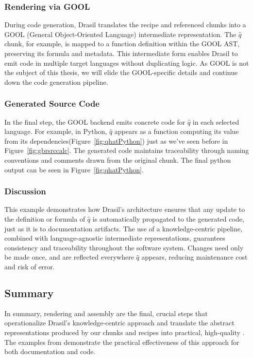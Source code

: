 \subsubsection{Rendering via GOOL}

During code generation, Drasil translates the recipe and referenced chunks into 
a GOOL (General Object-Oriented Language) intermediate representation. The 
$\hat{q}$ chunk, for example, is mapped to a function definition within the 
GOOL AST, preserving its formula and metadata. This intermediate form enables 
Drasil to emit code in multiple target languages without duplicating logic. As 
GOOL is not the subject of this thesis, we will elide the GOOL-specific details 
and continue down the code generation pipeline.

\subsubsection{Generated Source Code}

In the final step, the GOOL backend emits concrete code for $\hat{q}$ in each 
selected language. For example, in Python, $\hat{q}$ appears as a function 
computing its value from its dependencies(Figure~\ref{fig:qhatPython}) just as 
we've seen before in Figure~\ref{fig:gbrsrccalc}. The generated code maintains 
traceability through naming conventions and comments drawn from the original 
chunk. The final python output can be seen in Figure~\ref{fig:qhatPython}.


\subsubsection{Discussion}

This example demonstrates how Drasil’s architecture ensures that any update to 
the definition or formula of $\hat{q}$ is automatically propagated to the 
generated code, just as it is to documentation artifacts. The use of a 
knowledge-centric pipeline, combined with language-agnostic intermediate 
representations, guarantees consistency and traceability throughout the 
software system. Changes need only be made once, and are reflected everywhere 
$\hat{q}$ appears, reducing maintenance cost and risk of error.

\subsection{Summary}
In summary, rendering and assembly are the final, crucial steps that 
operationalize Drasil's knowledge-centric approach and translate the abstract 
representations produced by our chunks and recipes into practical, high-quality 
\sfs{}. The examples from \gb{} demonstrate the practical effectiveness of this 
approach for both documentation and code.

